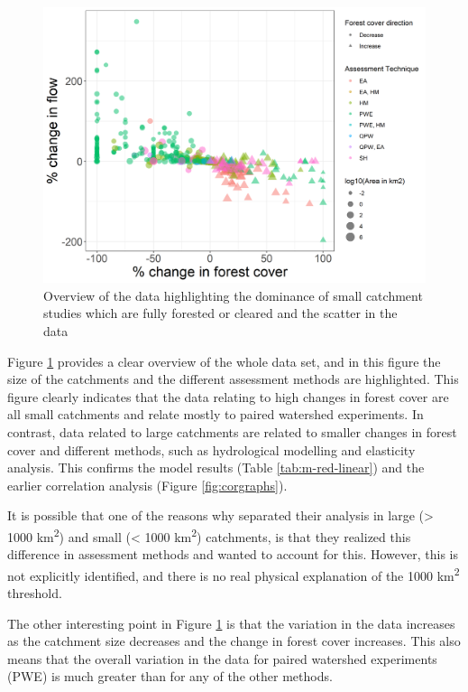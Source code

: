 \documentclass[]{elsarticle} %
\begin{document}
\begin{figure}
\includegraphics[width=0.9\linewidth]{flow_forest_byArea} \caption{Overview of the data highlighting the dominance of small catchment studies which are fully forested or cleared and the scatter in the data}\label{fig:overview}
\end{figure}

Figure \ref{fig:overview} provides a clear overview of the whole data set, and in this figure the size of the catchments and the different assessment methods are highlighted. This figure clearly indicates that the data relating to high changes in forest cover are all small catchments and relate mostly to paired watershed experiments. In contrast, data related to large catchments are related to smaller changes in forest cover and different methods, such as hydrological modelling and elasticity analysis. This confirms the model results (Table \ref{tab:m-red-linear}) and the earlier correlation analysis (Figure \ref{fig:corgraphs}).

It is possible that one of the reasons why \citet{zhang2017} separated their analysis in large (\textgreater{} 1000 km\textsuperscript{2}) and small (\textless{} 1000 km\textsuperscript{2}) catchments, is that they realized this difference in assessment methods and wanted to account for this. However, this is not explicitly identified, and there is no real physical explanation of the 1000 km\textsuperscript{2} threshold.

The other interesting point in Figure \ref{fig:overview} is that the variation in the data increases as the catchment size decreases and the change in forest cover increases. This also means that the overall variation in the data for paired watershed experiments (PWE) is much greater than for any of the other methods.
\end{document}
